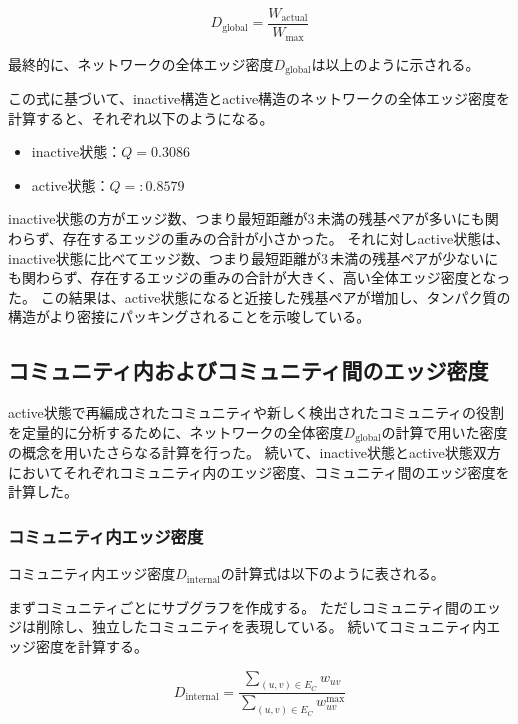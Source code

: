 \begin{equation}
D_{\text{global}} = \frac{W_{\text{actual}}}{W_{\text{max}}}
\label{eq:global_density}
\end{equation}

最終的に、ネットワークの全体エッジ密度$D_{\text{global}}$は以上のように示される。

この式に基づいて、inactive構造とactive構造のネットワークの全体エッジ密度を計算すると、それぞれ以下のようになる。
\begin{itemize}
    \item inactive状態：\( Q = 0.3086 \)
    \item active状態：\( Q = :0.8579 \)
\end{itemize}

inactive状態の方がエッジ数、つまり最短距離が3\,\text{\AA}未満の残基ペアが多いにも関わらず、存在するエッジの重みの合計が小さかった。
それに対しactive状態は、inactive状態に比べてエッジ数、つまり最短距離が3\,\text{\AA}未満の残基ペアが少ないにも関わらず、存在するエッジの重みの合計が大きく、高い全体エッジ密度となった。
この結果は、active状態になると近接した残基ペアが増加し、タンパク質の構造がより密接にパッキングされることを示唆している。

\subsection{コミュニティ内およびコミュニティ間のエッジ密度}
active状態で再編成されたコミュニティや新しく検出されたコミュニティの役割を定量的に分析するために、ネットワークの全体密度$D_{\text{global}}$の計算で用いた密度の概念を用いたさらなる計算を行った。
続いて、inactive状態とactive状態双方においてそれぞれコミュニティ内のエッジ密度、コミュニティ間のエッジ密度を計算した。

\subsubsection{コミュニティ内エッジ密度}
コミュニティ内エッジ密度$D_{\text{internal}}$の計算式は以下のように表される。

まずコミュニティごとにサブグラフを作成する。
ただしコミュニティ間のエッジは削除し、独立したコミュニティを表現している。
続いてコミュニティ内エッジ密度を計算する。

\begin{equation}
D_{\text{internal}} = \frac{\sum_{(u,v) \in E_C} w_{uv}}{\sum_{(u,v) \in E_C} w_{uv}^{\text{max}}}
\label{eq:internal_density}
\end{equation}


